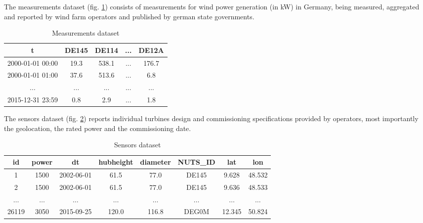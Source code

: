 The measurements dataset (fig. \ref{table:measurements-dataset}) consists of measurements for wind power generation (in kW) in Germany, being measured, aggregated and reported by wind farm operators and published by german state governments.

\begin{table}[H]
\centering
\caption{Measurements dataset} \label{table:measurements-dataset}
\begin{tabular}{lcccc}
\hline
\multicolumn{1}{c}{t}   & DE145 & DE114 & ... & DE12A \\ \hline
2000-01-01 00:00        & 19.3  & 538.1 & ... & 176.7 \\
2000-01-01 01:00        & 37.6  & 513.6 & ... & 6.8   \\
\multicolumn{1}{c}{...} & ...   & ...   & ... & ...   \\
2015-12-31 23:59        & 0.8   & 2.9   & ... & 1.8   \\ \hline
\end{tabular}
\end{table}

The sensors dataset (fig. \ref{table:sensors-dataset}) reports individual turbines design and commissioning specifications provided by operators, most importantly the geolocation, the rated power and the commissioning date.

\begin{table}[]
\centering
\caption{Sensors dataset} \label{table:sensors-dataset}
\begin{tabular}{cccccccc}
\hline
\textbf{id} & \textbf{power} & \textbf{dt} & \textbf{hubheight} & \textbf{diameter} & \textbf{NUTS\_ID}& \textbf{lat} & \textbf{lon} \\ \hline
1                            & 1500                            & 2002-06-01                   & 61.5                                & 77.0                               & DE145                              & 9.628                         & 48.532                        \\
2                            & 1500                            & 2002-06-01                   & 61.5                                & 77.0                               & DE145                              & 9.636                         & 48.533                        \\
$\dots$                      & $\dots$                         & $\dots$                      & $\dots$                             & $\dots$                            & $\dots$                            & $\dots$                       & $\dots$                       \\
26119                        & 3050                            & 2015-09-25                   & 120.0                               & 116.8                              & DEG0M                              & 12.345                        & 50.824                        \\ \hline
\end{tabular}
\end{table}

